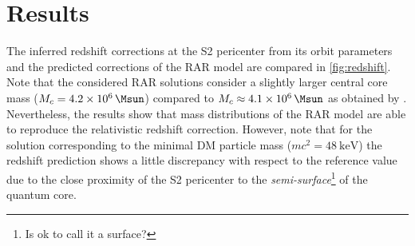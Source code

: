 \documentclass[nofootinbib,tightenlines,nobibnotes,aps,prl,preprint,groupedaddress]{revtex4-1}
\begin{document}
\section{Results}
The inferred redshift corrections at the S2 pericenter from its orbit parameters and the predicted corrections of the RAR model are compared in \cref{fig:redshift}. Note that the considered RAR solutions consider a slightly larger central core mass ($M_c = \SI{4.2E6}{\Msun}$) compared to $M_c \approx \SI{4.1E6}{\Msun}$ as obtained by \citet{2018A&A...615L..15G}. Nevertheless, the results show that mass distributions of the RAR model are able to reproduce the relativistic redshift correction. However, note that for the solution corresponding to the minimal DM particle mass ($mc^2 = \SI{48}{\kilo\eV}$) the redshift prediction shows a little discrepancy with respect to the reference value due to the close proximity of the S2 pericenter to the \textit{semi-surface}\footnote{Is ok to call it a surface?} of the quantum core.




\end{document}
